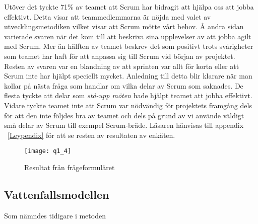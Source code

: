 Utöver det tyckte 71\% av teamet att Scrum har bidragit att hjälpa oss att jobba effektivt. Detta visar att teammedlemmarna är nöjda med valet av utvecklingsmetodiken vilket visar att Scrum mötte vårt behov. Å andra sidan varierade svaren när det kom till att beskriva sina upplevelser av att jobba agilt med Scrum. Mer än hälften av teamet beskrev det som positivt trots svårigheter som teamet har haft för att anpassa sig till Scrum vid början av projektet. Resten av svaren var en blandning av att sprinten var allt för korta eller att Scrum inte har hjälpt speciellt mycket. Anledning till detta blir klarare när man kollar på nästa fråga som handlar om vilka delar av Scrum som saknades. De flesta tyckte att delar som \textit{stå-upp möten} hade  hjälpt teamet att jobba effektivt. Vidare tyckte teamet inte att Scrum var nödvändig för projektets framgång dels för att den inte följdes bra av teamet och dels på grund av vi använde väldigt små delar av Scrum till exempel Scrum-bräde.
Läsaren hänvisas till appendix ~\ref{Leypendix} för att se resten av resultaten av enkäten.
\begin{figure*}[h]
	\centering
	\texttt{[image: q1\_4]}
	\caption{Resultat från frågeformuläret}\label{fig1}
	\label{q1}
\end{figure*}
\subsection{Vattenfallsmodellen}
Som nämndes tidigare i metoden 
\newpage